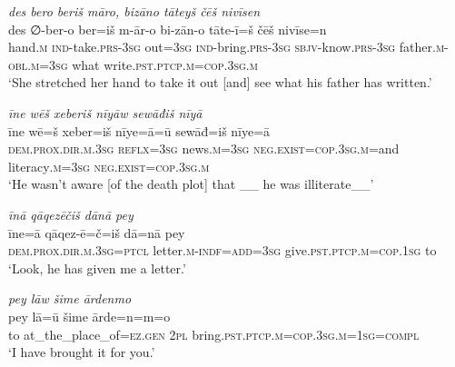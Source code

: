 \ea \label{KŠ.71}
\textit{des bero beriš māro, bizāno tāteyš čēš nivīsen} \\ 
\gll des ∅-ber-o ber=iš m-ār-o bi-zān-o tāte-ī=š čēš nivīse=n \\ 
 hand\textsc{.m} \textsc{ind-}take\textsc{.prs}\textsc{-3sg} out\textsc{=3sg} \textsc{ind-}bring\textsc{.prs}\textsc{-3sg} \textsc{sbjv-}know\textsc{.prs}\textsc{-3sg} father\textsc{.m}\textsc{-obl}\textsc{.m}\textsc{=3sg} what write\textsc{.pst}\textsc{.ptcp}\textsc{.m}\textsc{=cop}\textsc{.3sg}\textsc{.m} \\ 
\glt `She stretched her hand to take it out [and] see what his father has written.'
\z 
 
\ea \label{KŠ.76}
\textit{īne wēš xeberiš nīyāw sewāđiš nīyā} \\ 
\gll īne wē=š xeber=iš nīye=ā=ū sewāđ=iš nīye=ā \\ 
 \textsc{dem.prox}\textsc{.dir}\textsc{.m}\textsc{.3sg} \textsc{reflx}\textsc{=3sg} news\textsc{.m}\textsc{=3sg} \textsc{\textsc{neg.}exist}\textsc{=cop}\textsc{.3sg}\textsc{.m}=and literacy\textsc{.m}\textsc{=3sg} \textsc{\textsc{neg.}exist}\textsc{=cop}\textsc{.3sg}\textsc{.m} \\ 
\glt `He wasn’t aware [of the death plot] that \_\_ he was illiterate\_\_'
\z 
 
\ea \label{KŠ.84}
\textit{īnā qāqezēčiš dānā pey} \\ 
\gll īne=ā qāqez-ē=č=iš dā=nā pey \\ 
 \textsc{dem.prox}\textsc{.dir}\textsc{.m}\textsc{.3sg}=\textsc{ptcl} letter\textsc{.m}\textsc{-indf}\textsc{=add}\textsc{=3sg} give\textsc{.pst}\textsc{.ptcp}\textsc{.m}\textsc{=cop}\textsc{.\textsc{1sg}} to \\ 
\glt `Look, he has given me a letter.'
\z 
 
\ea \label{KŠ.85}
\textit{pey lāw šime ārdenmo} \\ 
\gll pey lā=ū šime ārde=n=m=o \\ 
 to at\_the\_place\_of\textsc{\textsc{=ez.gen}} \textsc{2pl} bring\textsc{.pst}\textsc{.ptcp}\textsc{.m}\textsc{=cop}\textsc{.3sg}\textsc{.m}\textsc{=\textsc{1sg}}\textsc{=compl} \\ 
\glt `I have brought it for you.'
\z 
 
